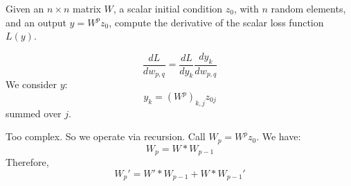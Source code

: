 \documentclass[11pt]{article}
\begin{document}
Given an $n\times n$ matrix $W$, a scalar initial condition $z_0$, with $n$ random elements, 
and an output $y = W^p z_0$, compute the derivative of the scalar loss function $L(y)$. 

$$
\frac{dL}{dw_{p,q}} = \frac{dL}{dy_k}\frac{dy_k}{dw_{p,q}}
$$
We consider $y$: 
$$
y_k = (W^p)_{k,j} z_{0j}
$$
summed over $j$. 

Too complex. So we operate via recursion.
Call $W_p = W^p z_0$. We have: 
$$
W_p = W * W_{p-1}
$$
Therefore, 
$$
W_p' = W' * W_{p-1} + W * W_{p-1}'
$$
\end{document}
